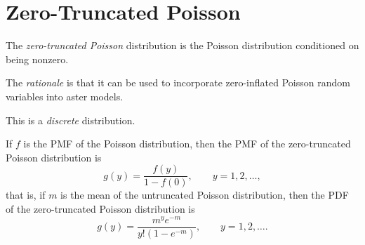 \section{Zero-Truncated Poisson}
\label{sec:zero-truncated-poisson}

The \emph{zero-truncated Poisson} distribution is the Poisson distribution
conditioned on being nonzero.

The \emph{rationale} is that it can be used to incorporate zero-inflated
Poisson random variables into aster models.

This is a \emph{discrete} distribution.

If $f$ is the PMF of the Poisson distribution, then the PMF of
the zero-truncated Poisson distribution is
\begin{equation} \label{eq:zero-truncated-poisson-pmf-in-terms-of-poisson}
   g(y) = \frac{f(y)}{1 - f(0)}, 
   \qquad y = 1, 2, \ldots,
\end{equation}
that is, if $m$ is the mean of the untruncated Poisson distribution, then
the PDF of the zero-truncated Poisson distribution is
\begin{equation} \label{eq:zero-truncated-poisson-pmf}
   g(y) = \frac{m^y e^{- m}}{y ! (1 - e^{- m})}, 
   \qquad y = 1, 2, \ldots.
\end{equation}

